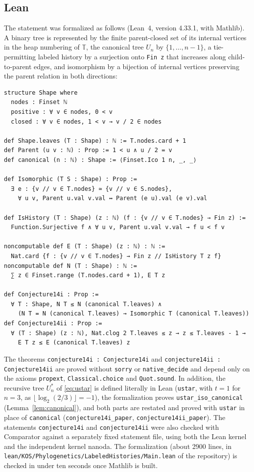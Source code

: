 \documentclass[11pt]{amsart}
\theoremstyle{definition}
\theoremstyle{remark}
\newcommand{\T}{\mathbb{T}}
\begin{document}
\subsection*{Lean}
The statement was formalized as follows (Lean~4, version 4.33.1, with Mathlib).
A binary tree is represented by the finite parent-closed set of its internal vertices in the heap numbering of $\T$, the canonical tree $U_n$ by $\{1,\dots,n-1\}$, a tie-permitting labeled history by a surjection onto \texttt{Fin z} that increases along child-to-parent edges, and isomorphism by a bijection of internal vertices preserving the parent relation in both directions:
\begin{Verbatim}[fontsize=\small,frame=single]
structure Shape where
  nodes : Finset ℕ
  positive : ∀ v ∈ nodes, 0 < v
  closed : ∀ v ∈ nodes, 1 < v → v / 2 ∈ nodes

def Shape.leaves (T : Shape) : ℕ := T.nodes.card + 1
def Parent (u v : ℕ) : Prop := 1 < u ∧ u / 2 = v
def canonical (n : ℕ) : Shape := ⟨Finset.Ico 1 n, _, _⟩

def Isomorphic (T S : Shape) : Prop :=
  ∃ e : {v // v ∈ T.nodes} ≃ {v // v ∈ S.nodes},
    ∀ u v, Parent u.val v.val ↔ Parent (e u).val (e v).val

def IsHistory (T : Shape) (z : ℕ) (f : {v // v ∈ T.nodes} → Fin z) :=
  Function.Surjective f ∧ ∀ u v, Parent u.val v.val → f u < f v

noncomputable def E (T : Shape) (z : ℕ) : ℕ :=
  Nat.card {f : {v // v ∈ T.nodes} → Fin z // IsHistory T z f}
noncomputable def N (T : Shape) : ℕ :=
  ∑ z ∈ Finset.range (T.nodes.card + 1), E T z

def Conjecture14i : Prop :=
  ∀ T : Shape, N T ≤ N (canonical T.leaves) ∧
    (N T = N (canonical T.leaves) → Isomorphic T (canonical T.leaves))
def Conjecture14ii : Prop :=
  ∀ (T : Shape) (z : ℕ), Nat.clog 2 T.leaves ≤ z → z ≤ T.leaves - 1 →
    E T z ≤ E (canonical T.leaves) z
\end{Verbatim}
{\sloppy The theorems \texttt{conjecture14i : Conjecture14i} and \texttt{conjecture14ii : Conjecture14ii} are proved without \texttt{sorry} or \texttt{native\_decide} and depend only on the axioms \texttt{propext}, \texttt{Classical.choice} and \texttt{Quot.sound}.
In addition, the recursive tree $U^*_n$ of \eqref{eq:ustar} is defined literally in Lean (\texttt{ustar}, with $t=1$ for $n=3$, as $\lfloor\log_2(2/3)\rfloor=-1$), the formalization proves \texttt{ustar\_iso\_canonical} (Lemma~\ref{lem:canonical}), and both parts are restated and proved with \texttt{ustar} in place of \texttt{canonical} (\texttt{conjecture14i\_paper}, \texttt{conjecture14ii\_paper}).
The statements \texttt{conjecture14i} and \texttt{conjecture14ii} were also checked with Comparator against a separately fixed statement file, using both the Lean kernel and the independent kernel nanoda.
The formalization (about 2900 lines, in \nolinkurl{lean/KOS/Phylogenetics/LabeledHistories/Main.lean} of the repository) is checked in under ten seconds once Mathlib is built.\par}
\end{document}
